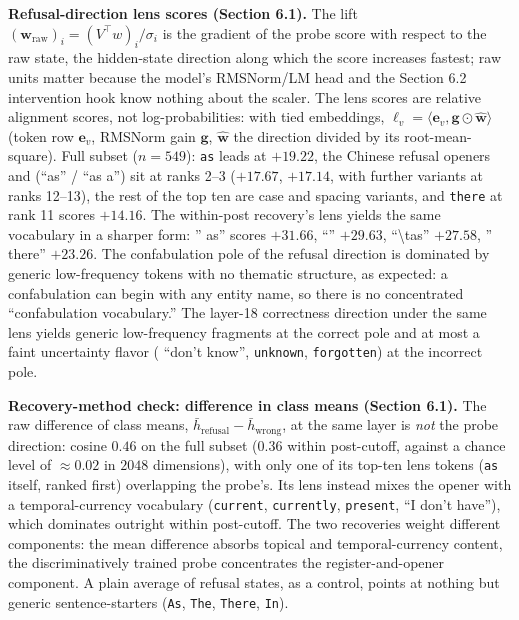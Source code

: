 \textbf{Refusal-direction lens scores (Section 6.1).} The lift
\((\mathbf{w}_{\mathrm{raw}})_i = (V^\top w)_i / \sigma_i\) is the
gradient of the probe score with respect to the raw state, the
hidden-state direction along which the score increases fastest; raw
units matter because the model's RMSNorm/LM head and the Section 6.2
intervention hook know nothing about the scaler. The lens scores are
relative alignment scores, not log-probabilities: with tied embeddings,
\(\ell_v = \langle \mathbf{e}_v, \mathbf{g} \odot \hat{\mathbf{w}} \rangle\)
(token row \(\mathbf{e}_v\), RMSNorm gain \(\mathbf{g}\),
\(\hat{\mathbf{w}}\) the direction divided by its root-mean-square).
Full subset (\(n=549\)): \texttt{as} leads at \(+19.22\), the Chinese refusal
openers \texttt{} and \texttt{} (``as'' / ``as a'') sit at
ranks 2--3 (\(+17.67\), \(+17.14\), with further variants at ranks
12--13), the rest of the top ten are case and spacing variants, and
\texttt{there} at rank 11 scores \(+14.16\). The within-post recovery's
lens yields the same vocabulary in a sharper form: '' as'' scores
\(+31.66\), ``'' \(+29.63\), ``\textbackslash tas'' \(+27.58\),
'' there'' \(+23.26\). The confabulation pole of the refusal direction
is dominated by generic low-frequency tokens with no thematic structure,
as expected: a confabulation can begin with any entity name, so there is
no concentrated ``confabulation vocabulary.'' The layer-18 correctness
direction under the same lens yields generic low-frequency fragments at
the correct pole and at most a faint uncertainty flavor (\texttt{}
``don't know'', \texttt{unknown}, \texttt{forgotten}) at the incorrect
pole.

\textbf{Recovery-method check: difference in class means (Section
6.1).} The raw difference of class means,
\(\bar{h}_{\mathrm{refusal}} - \bar{h}_{\mathrm{wrong}}\), at the same
layer is \emph{not} the probe direction: cosine \(0.46\) on the full
subset (\(0.36\) within post-cutoff, against a chance level of
\(\approx 0.02\) in \(2048\) dimensions), with only one of its top-ten
lens tokens (\texttt{as} itself, ranked first) overlapping the probe's.
Its lens instead mixes the opener with a temporal-currency vocabulary
(\texttt{current}, \texttt{currently}, \texttt{present}, \texttt{}
``I don't have''), which dominates outright within post-cutoff. The two
recoveries weight different components: the mean difference absorbs
topical and temporal-currency content, the discriminatively trained
probe concentrates the register-and-opener component. A plain average of
refusal states, as a control, points at nothing but generic
sentence-starters (\texttt{As}, \texttt{The}, \texttt{There},
\texttt{In}).


